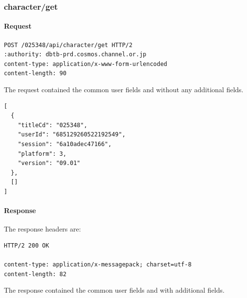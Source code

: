 \subsubsection{character/get}
\label{subsec:api_character_get}

\paragraph{Request}

\begin{lstlisting}
POST /025348/api/character/get HTTP/2
:authority: dbtb-prd.cosmos.channel.or.jp
content-type: application/x-www-form-urlencoded
content-length: 90
\end{lstlisting}

The request contained the common user fields and without any additional fields.

\begin{lstlisting}
[
  {
    "titleCd": "025348",
    "userId": "685129260522192549",
    "session": "6a10adec47166",
    "platform": 3,
    "version": "09.01"
  },
  []
]
\end{lstlisting}

\newpage

\paragraph{Response}

The response headers are:

\begin{lstlisting}
HTTP/2 200 OK

content-type: application/x-messagepack; charset=utf-8
content-length: 82
\end{lstlisting}

The response contained the common user fields and with additional fields.

